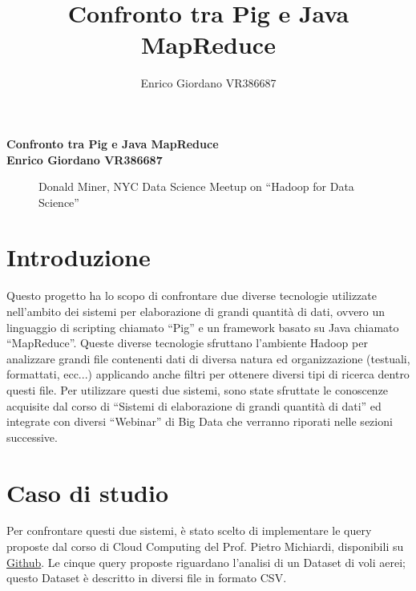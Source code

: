 \documentclass[11pt]{report} %
\title{Confronto tra Pig e Java MapReduce}
\author{Enrico Giordano VR386687}
\begin{document}
\begin{titlepage}
    \centering
    \vfill
    {\bfseries\Large
        Confronto tra Pig e Java MapReduce\\
        \vskip2cm
        Enrico Giordano VR386687\\
    }    
    \vfill
    \begin{figure}[htbp]
    \centering
    	\caption{Donald Miner, NYC Data Science Meetup on “Hadoop for Data Science”}
    \end{figure}
     \vfill
    \vfill
\end{titlepage}

\newpage 

\section{Introduzione}

Questo progetto ha lo scopo di confrontare due diverse tecnologie utilizzate nell'ambito dei sistemi per elaborazione di grandi quantità di dati, ovvero un linguaggio di scripting chiamato ``Pig'' e un framework basato su Java chiamato ``MapReduce''. Queste diverse tecnologie sfruttano l'ambiente Hadoop per analizzare grandi file contenenti dati di diversa natura ed organizzazione (testuali, formattati, ecc...) applicando anche filtri per ottenere diversi tipi di ricerca dentro questi file. Per utilizzare questi due sistemi, sono state sfruttate le conoscenze acquisite dal corso di ``Sistemi di elaborazione di grandi quantità di dati'' ed integrate con diversi ``Webinar'' di Big Data che verranno riporati nelle sezioni successive.  

\section{Caso di studio}
Per confrontare questi due sistemi, è stato scelto di implementare le query proposte dal corso di Cloud Computing del Prof. Pietro Michiardi, disponibili su \href{https://github.com/michiard/CLOUDS-LAB/tree/master/labs/pig-lab/airtraffic-analysis}{Github}. Le cinque query proposte riguardano l'analisi di un Dataset di voli aerei; questo Dataset è descritto in diversi file in formato CSV. 
\end{document}
